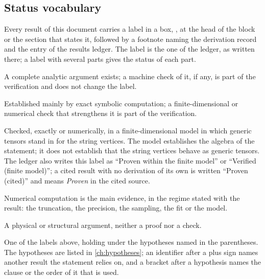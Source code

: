 \subsection{Status vocabulary}
\label{sec:pre:status}

Every result of this document carries a label in a box, , at the head of the block or the section that states it, followed by a footnote naming the derivation record and the entry of the results ledger.
The label is the one of the ledger, as written there; a label with several parts gives the status of each part.

\begin{description}
  \setlength{\itemsep}{0.5ex}

  \item[Proven] A complete analytic argument exists; a machine check of it, if any, is part of the verification and does not change the label.

  \item[Verified] Established mainly by exact symbolic computation; a finite-dimensional or numerical check that strengthens it is part of the verification.

  \item[Verified in a finite model] Checked, exactly or numerically, in a finite-dimensional model in which generic tensors stand in for the string vertices.
    The model establishes the algebra of the statement; it does not establish that the string vertices behave as generic tensors.
    The ledger also writes this label as \enquote{Proven within the finite model} or \enquote{Verified (finite model)}; a cited result with no derivation of its own is written \enquote{Proven (cited)} and means \emph{Proven} in the cited source.

  \item[Numerical] Numerical computation is the main evidence, in the regime stated with the result: the truncation, the precision, the sampling, the fit or the model.

  \item[Argued] A physical or structural argument, neither a proof nor a check.

  \item[Conditional(\ldots) -- \emph{label}] One of the labels above, holding under the hypotheses named in the parentheses.
    The hypotheses are listed in \cref{ch:hypotheses}; an identifier after a plus sign names another result the statement relies on, and a bracket after a hypothesis names the clause or the order of it that is used.


\end{description}
